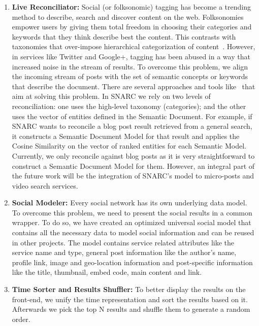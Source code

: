 \documentclass[oribibl]{../../Tools/LaTEX/llncs}
\begin{document}
\begin{enumerate}
\item {\bf Live Reconciliator:} Social (or folksonomic) tagging has become a trending method to describe, search and discover content on the web. Folksonomies empower users by giving them total freedom in choosing their categories and keywords that they think describe best the content. This contrasts with taxonomies that over-impose hierarchical categorization of content~\cite{Zanardi:RecSys:08}. However, in services like Twitter and Google+, tagging has been abused in a way that increased noise in the stream of results. To overcome this problem, we align the incoming stream of posts with the set of semantic concepts or keywords that describe the document. There are several approaches and tools like~\cite{Cantador:EC-WEB:11,Ernesto:RecSys:12,Preotiuc-Pietro:ICWSM:12,Zanardi:RecSys:08} that aim at solving this problem. In SNARC we rely on two levels of reconciliation: one uses the high-level taxonomy (categories); and the other uses the vector of entities defined in the Semantic Document. For example, if SNARC wants to reconcile a blog post result retrieved from a general search, it constructs a Semantic Document Model for that result and applies the Cosine Similarity on the vector of ranked entities for each Semantic Model. Currently, we only reconcile against blog posts as it is very straightforward to construct a Semantic Document Model for them. However, an integral part of the future work will be the integration of SNARC's model to micro-posts and video search services.

\item {\bf Social Modeler:} Every social network has its own underlying data model. To overcome this problem, we need to present the social results in a common wrapper. To do so, we have created an optimized universal social model that contains all the necessary data to model social information and can be reused in other projects. The model contains service related attributes like the service name and type, general post information like the author's name, profile link, image and geo-location information and post-specific information like the title, thumbnail, embed code, main content and link.
\item {\bf Time Sorter and Results Shuffler:} To better display the results on the front-end, we unify the time representation and sort the results based on it. Afterwards we pick the top N results and shuffle them to generate a random order.
\end{enumerate}
\end{document}
